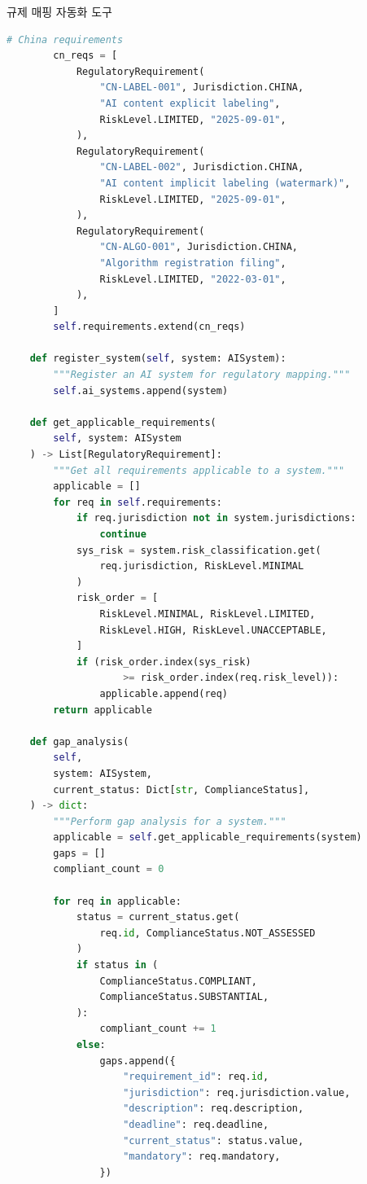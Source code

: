 \begin{practicaltool}{규제 매핑 자동화 도구}
\begin{lstlisting}[language=Python]
        # China requirements
        cn_reqs = [
            RegulatoryRequirement(
                "CN-LABEL-001", Jurisdiction.CHINA,
                "AI content explicit labeling",
                RiskLevel.LIMITED, "2025-09-01",
            ),
            RegulatoryRequirement(
                "CN-LABEL-002", Jurisdiction.CHINA,
                "AI content implicit labeling (watermark)",
                RiskLevel.LIMITED, "2025-09-01",
            ),
            RegulatoryRequirement(
                "CN-ALGO-001", Jurisdiction.CHINA,
                "Algorithm registration filing",
                RiskLevel.LIMITED, "2022-03-01",
            ),
        ]
        self.requirements.extend(cn_reqs)

    def register_system(self, system: AISystem):
        """Register an AI system for regulatory mapping."""
        self.ai_systems.append(system)

    def get_applicable_requirements(
        self, system: AISystem
    ) -> List[RegulatoryRequirement]:
        """Get all requirements applicable to a system."""
        applicable = []
        for req in self.requirements:
            if req.jurisdiction not in system.jurisdictions:
                continue
            sys_risk = system.risk_classification.get(
                req.jurisdiction, RiskLevel.MINIMAL
            )
            risk_order = [
                RiskLevel.MINIMAL, RiskLevel.LIMITED,
                RiskLevel.HIGH, RiskLevel.UNACCEPTABLE,
            ]
            if (risk_order.index(sys_risk)
                    >= risk_order.index(req.risk_level)):
                applicable.append(req)
        return applicable

    def gap_analysis(
        self,
        system: AISystem,
        current_status: Dict[str, ComplianceStatus],
    ) -> dict:
        """Perform gap analysis for a system."""
        applicable = self.get_applicable_requirements(system)
        gaps = []
        compliant_count = 0

        for req in applicable:
            status = current_status.get(
                req.id, ComplianceStatus.NOT_ASSESSED
            )
            if status in (
                ComplianceStatus.COMPLIANT,
                ComplianceStatus.SUBSTANTIAL,
            ):
                compliant_count += 1
            else:
                gaps.append({
                    "requirement_id": req.id,
                    "jurisdiction": req.jurisdiction.value,
                    "description": req.description,
                    "deadline": req.deadline,
                    "current_status": status.value,
                    "mandatory": req.mandatory,
                })


\end{lstlisting}
\end{practicaltool}
